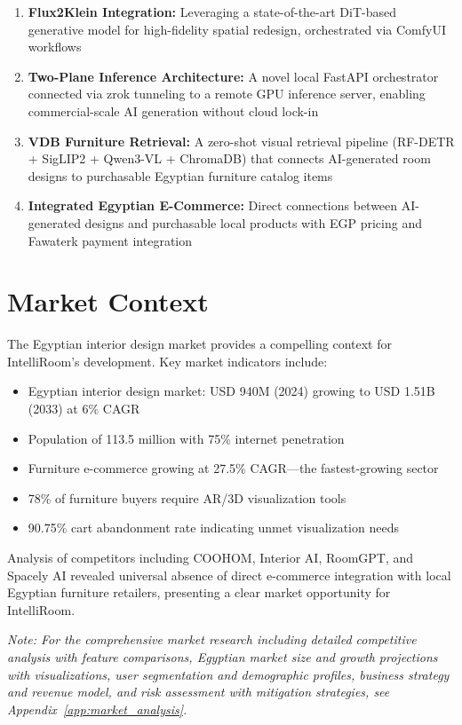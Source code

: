 \begin{enumerate}
    \item \textbf{Flux2Klein Integration:} Leveraging a state-of-the-art DiT-based generative model for high-fidelity spatial redesign, orchestrated via ComfyUI workflows
    
    \item \textbf{Two-Plane Inference Architecture:} A novel local FastAPI orchestrator connected via zrok tunneling to a remote GPU inference server, enabling commercial-scale AI generation without cloud lock-in
    
    \item \textbf{VDB Furniture Retrieval:} A zero-shot visual retrieval pipeline (RF-DETR + SigLIP2 + Qwen3-VL + ChromaDB) that connects AI-generated room designs to purchasable Egyptian furniture catalog items
    
    \item \textbf{Integrated Egyptian E-Commerce:} Direct connections between AI-generated designs and purchasable local products with EGP pricing and Fawaterk payment integration
\end{enumerate}

\section{Market Context}
\label{sec:market_context}

The Egyptian interior design market provides a compelling context for IntelliRoom's development. Key market indicators include:

\begin{itemize}
    \item Egyptian interior design market: USD 940M (2024) growing to USD 1.51B (2033) at 6\% CAGR
    \item Population of 113.5 million with 75\% internet penetration
    \item Furniture e-commerce growing at 27.5\% CAGR---the fastest-growing sector
    \item 78\% of furniture buyers require AR/3D visualization tools
    \item 90.75\% cart abandonment rate indicating unmet visualization needs
\end{itemize}

Analysis of competitors including COOHOM, Interior AI, RoomGPT, and Spacely AI revealed universal absence of direct e-commerce integration with local Egyptian furniture retailers, presenting a clear market opportunity for IntelliRoom.

\vspace{0.5cm}
\noindent\textit{Note: For the comprehensive market research including detailed competitive analysis with feature comparisons, Egyptian market size and growth projections with visualizations, user segmentation and demographic profiles, business strategy and revenue model, and risk assessment with mitigation strategies, see Appendix~\ref{app:market_analysis}.}

